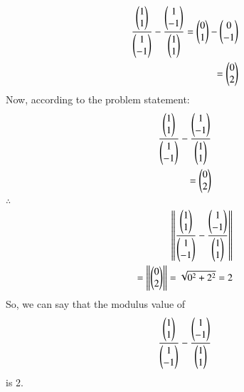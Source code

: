 \begin{align}
\frac{\myvec{1\\1}}{\myvec{1\\-1}} - \frac{\myvec{1\\-1}}{\myvec{1\\1}} = \myvec{0\\1} - \myvec{0\\-1} \\
      = \myvec{0\\2}
\end{align}
Now, according to the problem statement:
\begin{align}
\frac{\myvec{1\\1}}{\myvec{1\\-1}} - \frac{\myvec{1\\-1}}{\myvec{1\\1}} \\
      = \myvec{0\\2}
\end{align} 
$\therefore$ 
\begin{align}
\norm{\frac{\myvec{1\\1}}{\myvec{1\\-1}} - \frac{\myvec{1\\-1}}{\myvec{1\\1}}} \\
      =\norm{\myvec{0\\2}} = \sqrt{0^2 + 2^2} = 2
\end{align} 
So, we can say that the modulus value of 
\begin{align}
\frac{\myvec{1\\1}}{\myvec{1\\-1}} - \frac{\myvec{1\\-1}}{\myvec{1\\1}}
\end{align} is 2.

